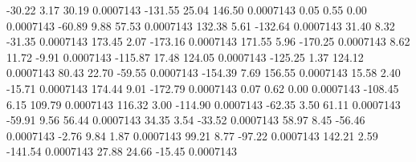       -30.22        3.17       30.19     0.0007143
     -131.55       25.04      146.50     0.0007143
        0.05        0.55        0.00     0.0007143
      -60.89        9.88       57.53     0.0007143
      132.38        5.61     -132.64     0.0007143
       31.40        8.32      -31.35     0.0007143
      173.45        2.07     -173.16     0.0007143
      171.55        5.96     -170.25     0.0007143
        8.62       11.72       -9.91     0.0007143
     -115.87       17.48      124.05     0.0007143
     -125.25        1.37      124.12     0.0007143
       80.43       22.70      -59.55     0.0007143
     -154.39        7.69      156.55     0.0007143
       15.58        2.40      -15.71     0.0007143
      174.44        9.01     -172.79     0.0007143
        0.07        0.62        0.00     0.0007143
     -108.45        6.15      109.79     0.0007143
      116.32        3.00     -114.90     0.0007143
      -62.35        3.50       61.11     0.0007143
      -59.91        9.56       56.44     0.0007143
       34.35        3.54      -33.52     0.0007143
       58.97        8.45      -56.46     0.0007143
       -2.76        9.84        1.87     0.0007143
       99.21        8.77      -97.22     0.0007143
      142.21        2.59     -141.54     0.0007143
       27.88       24.66      -15.45     0.0007143
